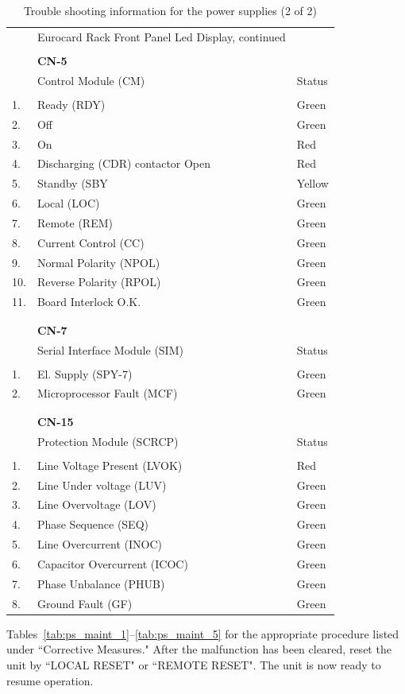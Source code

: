 \begin{table}
\caption{Trouble shooting information for the power supplies (2 of 2) 
\label{tab:ps_ts_2}}

\begin{tabular}{lll}
& Eurocard Rack Front Panel Led Display, continued &	\\
&	&	\\
& {\bf CN-5} &	\\
& Control Module (CM)	& Status	\\
&	&	\\
1.& Ready (RDY) & Green \\
2.& Off & Green \\
3.& On & Red \\
4.& Discharging (CDR) contactor Open & Red \\
5.& Standby (SBY & Yellow \\
6.& Local (LOC) & Green \\
7.& Remote (REM) & Green \\
8.& Current Control (CC) & Green \\
9.& Normal Polarity (NPOL) & Green \\
10.& Reverse Polarity (RPOL) & Green \\
11.& Board Interlock O.K. & Green \\
&	&	\\
&	&	\\
& {\bf CN-7} &	\\
& Serial Interface Module (SIM)	& Status	\\
&	&	\\
1.& El. Supply (SPY-7) & Green \\
2.& Microprocessor Fault (MCF) & Green \\
&	&	\\
&	&	\\
& {\bf CN-15} &	\\
& Protection Module (SCRCP)	& Status	\\
&	&	\\
1.& Line Voltage Present (LVOK) & Red \\
2.& Line Under voltage (LUV) & Green \\
3.& Line Overvoltage (LOV) & Green \\
4.& Phase Sequence (SEQ) & Green \\
5.& Line Overcurrent (INOC) & Green \\
6.& Capacitor Overcurrent (ICOC) & Green \\
7.& Phase Unbalance (PHUB) & Green \\
8.& Ground Fault (GF) & Green \\
\end{tabular}
\end{table}
Tables~\ref{tab:ps_maint_1}--\ref{tab:ps_maint_5} for the appropriate procedure listed 
under ``Corrective Measures."  After the malfunction has been cleared, reset the unit by
``LOCAL RESET" or ``REMOTE RESET".  The unit is now ready to resume
operation.

